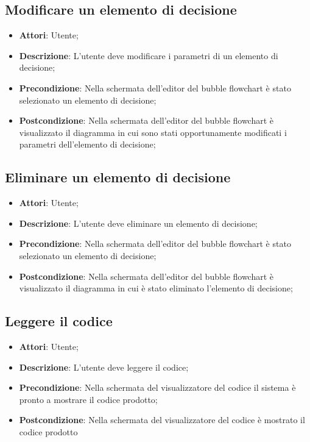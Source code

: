 \documentclass[../AnalisiDeiRequisiti.tex]{subfiles}
\begin{document}
	\subsection{Modificare un elemento di decisione}
	\begin{itemize}
		\item \textbf{Attori}: Utente;
		\item \textbf{Descrizione}: L'utente deve modificare i parametri di un elemento di decisione;
		\item \textbf{Precondizione}: Nella schermata dell'editor del bubble flowchart è stato selezionato un elemento di decisione;
		\item \textbf{Postcondizione}: Nella schermata dell'editor del bubble flowchart è visualizzato il diagramma in cui sono stati opportunamente modificati i parametri dell'elemento di decisione;
	\end{itemize}
	
	\subsection{Eliminare un elemento di decisione}
	\begin{itemize}
		\item \textbf{Attori}: Utente;
		\item \textbf{Descrizione}: L'utente deve eliminare un elemento di decisione;
		\item \textbf{Precondizione}: Nella schermata dell'editor del bubble flowchart è stato selezionato un elemento di decisione;
		\item \textbf{Postcondizione}: Nella schermata dell'editor del bubble flowchart è visualizzato il diagramma in cui è stato eliminato l'elemento di decisione;
	\end{itemize}
	
	
	\subsection{Leggere il codice}
	\begin{itemize}
		\item \textbf{Attori}: Utente;
		\item \textbf{Descrizione}: L'utente deve leggere il codice;
		\item \textbf{Precondizione}: Nella schermata del visualizzatore del codice il sistema è pronto a mostrare il codice prodotto;
		\item \textbf{Postcondizione}: Nella schermata del visualizzatore del codice è mostrato il codice prodotto
	\end{itemize}
	
\end{document}
